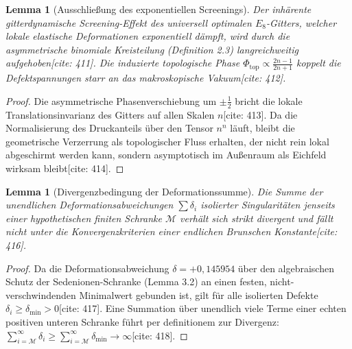 \documentclass[11pt,a4paper]{article}
\newcommand{\Eoct}{E_8}
\newtheorem{lemma}[theorem]{Lemma}
\theoremstyle{definition}
\begin{document}
	\begin{lemma}[Ausschließung des exponentiellen Screenings]
		Der inhärente gitterdynamische Screening-Effekt des universell optimalen $\Eoct$-Gitters, welcher lokale elastische Deformationen exponentiell dämpft, wird durch die asymmetrische binomiale Kreisteilung (Definition 2.3) langreichweitig aufgehoben[cite: 411]. Die induzierte topologische Phase $\Phi_{\text{top}} \propto \frac{2n-1}{2n+1}$ koppelt die Defektspannungen starr an das makroskopische Vakuum[cite: 412].
	\end{lemma}
	
	\begin{proof}
		Die asymmetrische Phasenverschiebung um $\pm \frac{1}{2}$ bricht die lokale Translationsinvarianz des Gitters auf allen Skalen $n$[cite: 413]. Da die Normalisierung des Druckanteils über den Tensor $n^n$ läuft, bleibt die geometrische Verzerrung als topologischer Fluss erhalten, der nicht rein lokal abgeschirmt werden kann, sondern asymptotisch im Außenraum als Eichfeld wirksam bleibt[cite: 414].
	\end{proof}
	
	\begin{lemma}[Divergenzbedingung der Deformationssumme]
		Die Summe der unendlichen Deformationsabweichungen $\sum \delta_i$ isolierter Singularitäten jenseits einer hypothetischen finiten Schranke $\mathcal{M}$ verhält sich strikt divergent und fällt nicht unter die Konvergenzkriterien einer endlichen Brunschen Konstante[cite: 416].
	\end{lemma}
	
	\begin{proof}
		Da die Deformationsabweichung $\delta = +0{,}145954$ über den algebraischen Schutz der Sedenionen-Schranke (Lemma 3.2) an einen festen, nicht-verschwindenden Minimalwert gebunden ist, gilt für alle isolierten Defekte $\delta_i \ge \delta_{\min} > 0$[cite: 417]. Eine Summation über unendlich viele Terme einer echten positiven unteren Schranke führt per definitionem zur Divergenz: $\sum_{i=\mathcal{M}}^{\infty} \delta_i \ge \sum_{i=\mathcal{M}}^{\infty} \delta_{\min} \rightarrow \infty$[cite: 418].
	\end{proof}
	
\end{document}
